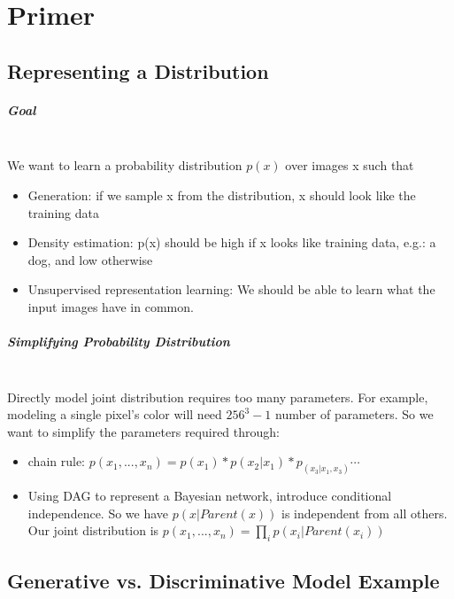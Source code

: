 \chapter{Primer}

\section{Representing a Distribution}
\paragraph{Goal} \mbox{}\\
We want to learn a probability distribution $p(x)$ over images x such that
    \begin{itemize}
        \item Generation: if we sample x from the distribution, x should look like the training data 
        \item Density estimation: p(x) should be high if x looks like training data, e.g.: a dog, and low otherwise
        \item Unsupervised representation learning: We should be able to learn what the input images have in common. 
    \end{itemize}


\paragraph{Simplifying Probability Distribution}\mbox{}\\
Directly model joint distribution requires too many parameters. For example, modeling a single pixel's color will need $256^3-1$ number of parameters. So we want to simplify the parameters required through: 
    \begin{itemize}
        \item chain rule: $p(x_1,...,x_n) = p(x_1)*p(x_2|x_1)*p_(x_3|x_1, x_3)\cdots$
        \item Using DAG to represent a Bayesian network, introduce conditional independence. So we have $p(x|Parent(x))$ is independent from all others. Our joint distribution is $p(x_1,...,x_n) = \prod_{i} p(x_i|Parent(x_i))$
    \end{itemize}
    
    
\section{Generative vs. Discriminative Model Example}

